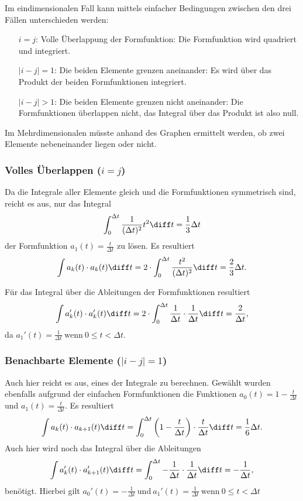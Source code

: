 Im eindimensionalen Fall kann mittels einfacher Bedingungen zwischen den drei Fällen unterschieden werden:
\begin{itemize}
    \item[$i = j$:] Volle Überlappung der Formfunktion: Die Formfunktion wird quadriert und integriert. 
    \item[$|i - j| = 1$:] Die beiden Elemente grenzen aneinander: Es wird über das Produkt der beiden Formfunktionen integriert.
    \item[$|i - j| > 1$:] Die beiden Elemente grenzen nicht aneinander: Die Formfunktionen überlappen nicht, das Integral über das Produkt ist also null.
\end{itemize}
Im Mehrdimensionalen müsste anhand des Graphen ermittelt werden, ob zwei Elemente nebeneinander liegen oder nicht.

\subsubsection{Volles Überlappen ($i = j$)}
Da die Integrale aller Elemente gleich und die Formfunktionen symmetrisch sind, reicht es aus, nur das Integral
\begin{equation}
    \int_{0}^{\Delta t} \frac{1}{(\Delta t)^2} t^2 \diff t = \frac{1}{3} \Delta t
\end{equation}
der Formfunktion $ a_1(t) = \frac{t}{\Delta t} $ zu lösen.
Es resultiert
\begin{equation}
    \int a_k(t) \cdot a_k(t) \diff t = 2 \cdot \int_{0}^{\Delta t} \frac{t^2}{(\Delta t)^2} \diff t = \frac{2}{3} \Delta t.
\end{equation}

Für das Integral über die Ableitungen der Formfunktionen resultiert
\begin{equation}
    \int a_k'(t) \cdot a_k'(t) \diff t = 2 \cdot \int_{0}^{\Delta t} \frac{1}{\Delta t} \cdot \frac{1}{\Delta t} \diff t = \frac{2}{\Delta t},
\end{equation}
da $a_1'(t)= \frac{1}{\Delta t} \ \text{wenn} \ 0 \leq t < \Delta t$.

\subsubsection{Benachbarte Elemente ($|i - j| = 1$)}
Auch hier reicht es aus, eines der Integrale zu berechnen. 
Gewählt wurden ebenfalls aufgrund der einfachen Formfunktionen die Funktionen $a_0(t) = 1 - \frac{t}{\Delta t}$ und $a_1(t) = \frac{t}{\Delta t}$.
Es resultiert
\begin{equation}
    \int a_k(t) \cdot a_{k+1}(t) \diff t = \int_{0}^{\Delta t} \left(1 - \frac{t}{\Delta t}\right) \cdot \frac{t}{\Delta t} \diff t = \frac{1}{6} \Delta t.
\end{equation}
Auch hier wird noch das Integral über die Ableitungen 
\begin{equation}
    \int a_k'(t) \cdot a_{k+1}'(t) \diff t = \int_{0}^{\Delta t} -\frac{1}{\Delta t} \cdot \frac{1}{\Delta t} \diff t = -\frac{1}{\Delta t},
\end{equation}
benötigt.
Hierbei gilt $a_0'(t)= -\frac{1}{\Delta t} \ \text{und} \ a_1'(t)= \frac{1}{\Delta t} \ \text{wenn} \ 0 \leq t < \Delta t$

